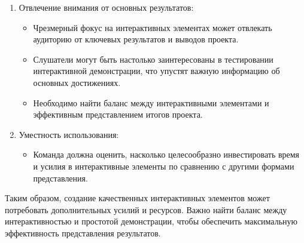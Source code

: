 \begin{enumerate}
\begin{itemize}
        \end{itemize}
    \item Отвлечение внимания от основных результатов:
        \begin{itemize}
            \item Чрезмерный фокус на интерактивных элементах может отвлекать аудиторию от ключевых результатов и выводов проекта.
            \item Слушатели могут быть настолько заинтересованы в тестировании интерактивной демонстрации, что упустят важную информацию об основных достижениях.
            \item Необходимо найти баланс между интерактивными элементами и эффективным представлением итогов проекта.
        \end{itemize}
    \item Уместность использования:
        \begin{itemize}
            \item Команда должна оценить, насколько целесообразно инвестировать время и усилия в интерактивные элементы по сравнению с другими формами представления.
        \end{itemize}
\end{enumerate}

Таким образом, создание качественных интерактивных элементов может потребовать дополнительных усилий и ресурсов. Важно найти баланс между интерактивностью и простотой демонстрации, чтобы обеспечить максимальную эффективность представления результатов.

